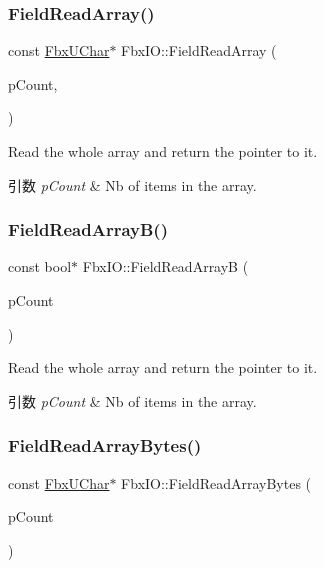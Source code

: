 \subsubsection{\texorpdfstring{Field\+Read\+Array()}{FieldReadArray()}\hspace{0.1cm}{\footnotesize\ttfamily [11/11]}}
{\footnotesize\ttfamily const \hyperlink{fbxtypes_8h_a1be3cadf61e76f49142eb83e66ffe8bd}{Fbx\+U\+Char}$\ast$ Fbx\+I\+O\+::\+Field\+Read\+Array (\begin{DoxyParamCaption}\item[{int \&}]{p\+Count,  }\item[{const \hyperlink{fbxtypes_8h_a1be3cadf61e76f49142eb83e66ffe8bd}{Fbx\+U\+Char} $\ast$}]{ }\end{DoxyParamCaption})}

Read the whole array and return the pointer to it. 
\begin{DoxyParams}{引数}
{\em p\+Count} & Nb of items in the array. \\
\hline
\end{DoxyParams}
\mbox{\label{class_fbx_i_o_a2c1cd02e013fc12ad530e61b1553b7f4}} 
\subsubsection{\texorpdfstring{Field\+Read\+Array\+B()}{FieldReadArrayB()}}
{\footnotesize\ttfamily const bool$\ast$ Fbx\+I\+O\+::\+Field\+Read\+ArrayB (\begin{DoxyParamCaption}\item[{int \&}]{p\+Count }\end{DoxyParamCaption})}

Read the whole array and return the pointer to it. 
\begin{DoxyParams}{引数}
{\em p\+Count} & Nb of items in the array. \\
\hline
\end{DoxyParams}
\mbox{\label{class_fbx_i_o_a77cfc95a0a4a68895d40d4bf3e493400}} 
\subsubsection{\texorpdfstring{Field\+Read\+Array\+Bytes()}{FieldReadArrayBytes()}}
{\footnotesize\ttfamily const \hyperlink{fbxtypes_8h_a1be3cadf61e76f49142eb83e66ffe8bd}{Fbx\+U\+Char}$\ast$ Fbx\+I\+O\+::\+Field\+Read\+Array\+Bytes (\begin{DoxyParamCaption}\item[{int \&}]{p\+Count }\end{DoxyParamCaption})}

